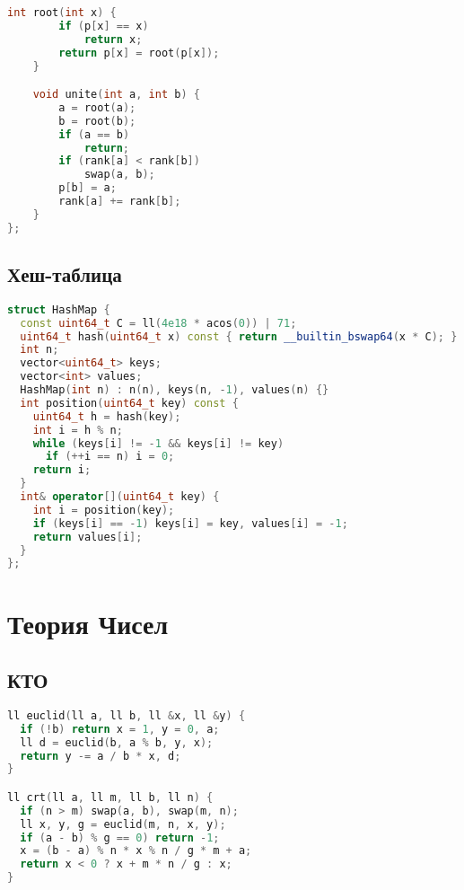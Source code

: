 \documentclass[10pt,a4paper,landscape,twosided]{extarticle}
\begin{document}
\begin{multicols}{3}
\begin{lstlisting}[language=C++]
    int root(int x) {
        if (p[x] == x)
            return x;
        return p[x] = root(p[x]);
    }

    void unite(int a, int b) {
        a = root(a);
        b = root(b);
        if (a == b)
            return;
        if (rank[a] < rank[b])
            swap(a, b);
        p[b] = a;
        rank[a] += rank[b];
    }
};
\end{lstlisting}

\subsection{Хеш-таблица}
\begin{lstlisting}[language=C++]
struct HashMap {
  const uint64_t C = ll(4e18 * acos(0)) | 71;
  uint64_t hash(uint64_t x) const { return __builtin_bswap64(x * C); }
  int n;
  vector<uint64_t> keys;
  vector<int> values;
  HashMap(int n) : n(n), keys(n, -1), values(n) {}
  int position(uint64_t key) const {
    uint64_t h = hash(key);
    int i = h % n;
    while (keys[i] != -1 && keys[i] != key)
      if (++i == n) i = 0;
    return i;
  }
  int& operator[](uint64_t key) {
    int i = position(key);
    if (keys[i] == -1) keys[i] = key, values[i] = -1;
    return values[i];
  }
};
\end{lstlisting}

\section{Теория Чисел}

\subsection{КТО}
\begin{lstlisting}[language=C++]
ll euclid(ll a, ll b, ll &x, ll &y) {
  if (!b) return x = 1, y = 0, a;
  ll d = euclid(b, a % b, y, x);
  return y -= a / b * x, d;
}

ll crt(ll a, ll m, ll b, ll n) {
  if (n > m) swap(a, b), swap(m, n);
  ll x, y, g = euclid(m, n, x, y);
  if (a - b) % g == 0) return -1;
  x = (b - a) % n * x % n / g * m + a;
  return x < 0 ? x + m * n / g : x;
}\end{lstlisting}


\end{multicols}
\end{document}
